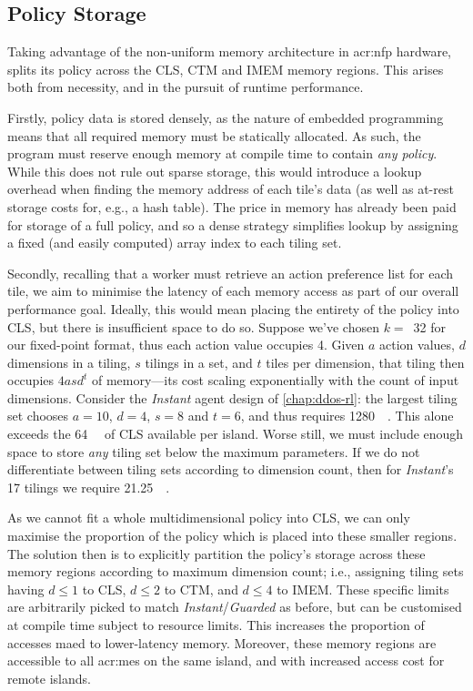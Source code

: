 \subsection{Policy Storage}
Taking advantage of the non-uniform memory architecture in \gls{acr:nfp} hardware, \approachshort{} splits its policy across the CLS, CTM and IMEM memory regions.
This arises both from necessity, and in the pursuit of runtime performance.

Firstly, policy data is stored densely, as the nature of embedded programming means that all required memory must be statically allocated.
As such, the program must reserve enough memory at compile time to contain \emph{any policy}.
While this does not rule out sparse storage, this would introduce a lookup overhead when finding the memory address of each tile's data (as well as at-rest storage costs for, e.g., a hash table).
The price in memory has already been paid for storage of a full policy, and so a dense strategy simplifies lookup by assigning a fixed (and easily computed) array index to each tiling set.

Secondly, recalling that a worker must retrieve an action preference list for each tile, we aim to minimise the latency of each memory access as part of our overall performance goal.
Ideally, this would mean placing the entirety of the policy into CLS, but there is insufficient space to do so.
Suppose we've chosen $k=$~\num{32} for our fixed-point format, thus each action value occupies \qty{4}{\byte}.
Given $a$ action values, $d$ dimensions in a tiling, $s$ tilings in a set, and $t$ tiles per dimension, that tiling then occupies $4asd^t$\unit{\byte} of memory---its cost scaling exponentially with the count of input dimensions.
Consider the \emph{Instant} agent design of \cref{chap:ddos-rl}: the largest tiling set chooses $a=10$, $d=4$, $s=8$ and $t=6$, and thus requires \qty{1280}{\kibi\byte}.
This alone exceeds the \qty{64}{\kibi\byte} of CLS available per island.
Worse still, we must include enough space to store \emph{any} tiling set below the maximum parameters.
If we do not differentiate between tiling sets according to dimension count, then for \emph{Instant}'s \num{17} tilings we require \qty{21.25}{\mebi\byte}.

As we cannot fit a whole multidimensional policy into CLS, we can only maximise the proportion of the policy which is placed into these smaller regions.
The solution then is to explicitly partition the policy's storage across these memory regions according to maximum dimension count; i.e., assigning tiling sets having $d\le1$ to CLS, $d\le2$ to CTM, and $d\le4$ to IMEM.
These specific limits are arbitrarily picked to match \emph{Instant}/\emph{Guarded} as before, but can be customised at compile time subject to resource limits.
This increases the proportion of accesses maed to lower-latency memory.
Moreover, these memory regions are accessible to all \glspl{acr:me} on the same island, and with increased access cost for remote islands.

